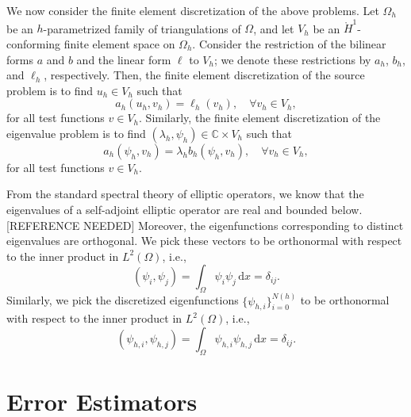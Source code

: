 We now consider the finite element discretization of the above problems.
Let \(\Omega_h\) be an \(h\)-parametrized family of triangulations of \(\Omega\),
and let \(V_h\) be an \(\mathring{H}^1\)-conforming finite element space on \(\Omega_h\).
Consider the restriction of the bilinear forms \(a\) and \(b\) and the linear form \(\ell\) to \(V_h\);
we denote these restrictions by \(a_h\), \(b_h\), and \(\ell_h\), respectively.
Then, the finite element discretization of the source problem is to find \(u_h \in V_h\) such that
\begin{equation}
    \label{eq:source_fem}
    a_h(u_h, v_h) = \ell_h(v_h), \quad \forall v_h \in V_h,
\end{equation}
for all test functions \(v \in V_h\).
Similarly, the finite element discretization of the eigenvalue problem is to find \((\lambda_h, \psi_h) \in \mathbb{C} \times V_h\) such that
\begin{equation}
    \label{eq:eigenvalue_fem}
    a_h(\psi_h, v_h) = \lambda_h b_h(\psi_h, v_h), \quad \forall v_h \in V_h,
\end{equation}
for all test functions \(v \in V_h\).

From the standard spectral theory of elliptic operators, we know that the eigenvalues of a self-adjoint elliptic operator are real and bounded below. [REFERENCE NEEDED]
Moreover, the eigenfunctions corresponding to distinct eigenvalues are orthogonal.
We pick these vectors to be orthonormal with respect to the inner product in \(L^2(\Omega)\), i.e.,
\begin{equation}
    \label{eq:orthonormality}
    (\psi_i, \psi_j) = \int_{\Omega} \psi_i \psi_j \, \mathrm{d}x = \delta_{ij}.
\end{equation}
Similarly, we pick the discretized eigenfunctions \(\{\psi_{h, i}\}_{i=0}^{N(h)}\) to be orthonormal with respect to the inner product in \(L^2(\Omega)\), i.e.,
\begin{equation}
    \label{eq:orthonormality_fem}
    (\psi_{h, i}, \psi_{h, j}) = \int_{\Omega} \psi_{h, i} \psi_{h, j} \, \mathrm{d}x = \delta_{ij}.
\end{equation}

\section{Error Estimators}

